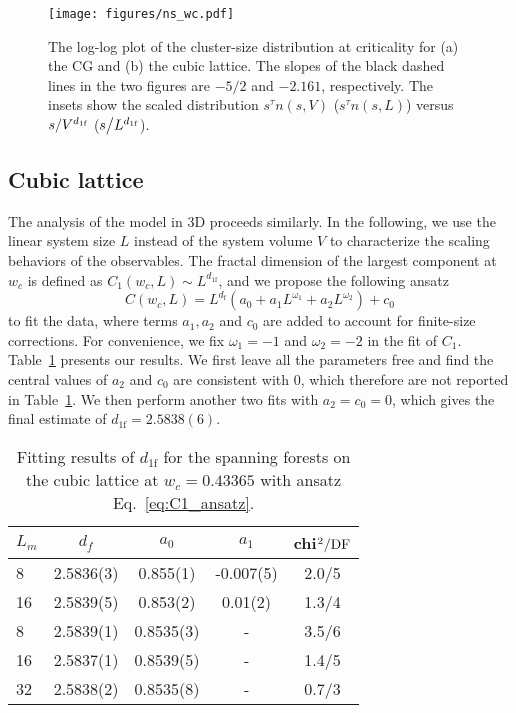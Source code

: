 \begin{figure}[h]
	\vspace{3ex}
	\centering
	\texttt{[image: figures/ns\_wc.pdf]}
	\caption{The log-log plot of the cluster-size distribution at criticality for (a) the CG and (b) the cubic lattice. 
	The slopes of the black dashed lines in the two figures are $-5/2$ and $-2.161$, respectively. 
	The insets show the scaled distribution $s^{\tau} n(s, V)$ ($s^{\tau} n(s, L)$) versus $s/V^{{d_{1\textrm{f}}}}$ ($s\big/L^{{d_{1\textrm{f}}}}$).}
	\label{fig:ns_wc}
\end{figure}

\subsection{Cubic lattice}
The analysis of the model in 3D proceeds similarly. In the following, we use the linear system size $L$ instead of the system volume $V$
to characterize the scaling behaviors of the observables. The fractal dimension of the largest component at $w_c$ 
is defined as $C_1(w_c, L) \sim L^{d_{1\textrm{f}}}$, and we propose the following ansatz 
\begin{equation}\label{eq:C1_ansatz}
    C(w_c, L) = L^{d_{\textrm{f}}}(a_0 + a_1L^{\omega_1} +a_2 L^{\omega_2}) + c_0
\end{equation}
to fit the data, where terms $a_1, a_2$ and $c_0$ are added to account for finite-size corrections. For convenience, we fix $\omega_1 = -1$ and $\omega_2 = -2$ in the fit 
of $C_1$. 
Table~\ref{tab:C1_wc_3D} presents our results. We first leave all the parameters free and find the central values of
$a_2$ and $c_0$ are consistent with 0, which therefore are not reported in Table~\ref{tab:C1_wc_3D}. We then perform another two fits
with $a_2 = c_0 = 0$, which gives the final estimate of $d_{1\textrm{f}} = 2.5838(6)$.

\begin{table}[h]
\centering
 \vspace{3ex}
\caption{Fitting results of $d_{1\textrm{f}}$ for the spanning forests on the cubic lattice at $w_c = 0.43365$ with ansatz Eq.~\eqref{eq:C1_ansatz}.}
\label{tab:C1_wc_3D} 
\begin{tabular}{|lcccc|}
\hline 
$L_{m}$   &$d_f$   &$a_0$   &$a_1$    & chi$^2/{\rm DF}$     \\
\hline 
8     &2.5836(3)    &0.855(1)   &-0.007(5)  &2.0/5\\ 
16    &2.5839(5)    &0.853(2)   &0.01(2)    &1.3/4\\ 
8     &2.5839(1)    &0.8535(3)  &-          &3.5/6\\ 
16    &2.5837(1)    &0.8539(5)  &-          &1.4/5\\ 
32    &2.5838(2)    &0.8535(8)  &-          &0.7/3\\ 
\hline 
\end{tabular} 
 \vspace{3ex}
\end{table} 

